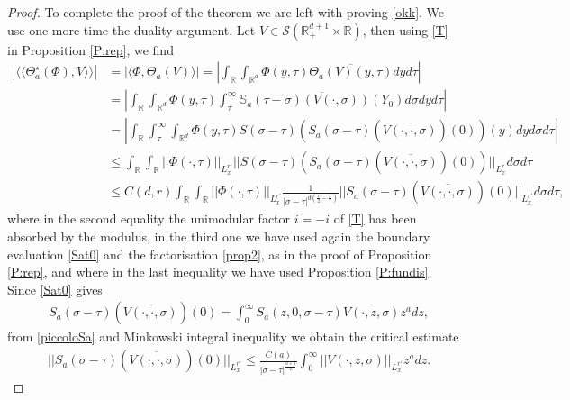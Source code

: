 \documentclass[11pt,letter]{amsart}
\def \RN {\mathbb{R}_+^{d+1}}
\def \R {\mathbb{R}}
\newcommand{\Rd}{\mathbb R^d}
\numberwithin{equation}{section}
\newcommand{\sa}{\langle}
\newcommand{\da}{\rangle}
\numberwithin{equation}{section}
\begin{document}
\begin{proof}
To complete the proof of the theorem we are left with proving \eqref{okk}. We use one more time the duality argument. Let $V\in \mathscr S(\RN\times \R)$, then using \eqref{T} in Proposition \ref{P:rep}, we find
\begin{align*}
\left|\sa\sa \Theta_a^\star(\Phi),V\da\da\right| & = \left|\sa \Phi,\Theta_a(V)\da\right| = \left|\int_{\R} \int_{\Rd} \Phi(y,\tau) \overline{\Theta_a(V)(y,\tau)} dy d\tau\right|
\\
& = \left|\int_{\R} \int_{\Rd} \Phi(y,\tau) \int_\tau^{\infty} \overline{\mathbb S_a(\tau-\sigma)(V(\cdot,\sigma))(Y_0)} d\sigma dy d\tau\right|
\\
& = \left|\int_{\R} \int_\tau^{\infty} \int_{\Rd}\Phi(y,\tau) S(\sigma-\tau)\left(S_a(\sigma-\tau)\left(\overline{V(\cdot,\cdot,\sigma)}\right)(0)\right)(y) dy d\sigma d\tau\right|
\\
& \le \int_{\R} \int_{\R} ||\Phi(\cdot,\tau)||_{L^{r'}_x} ||S(\sigma-\tau)\left(S_a(\sigma-\tau)\left(\overline{V(\cdot,\cdot,\sigma)}\right)(0)\right)||_{L^{r}_x} d\sigma d\tau
\\
& \le C(d,r) \int_{\R} \int_{\R} ||\Phi(\cdot,\tau)||_{L^{r'}_x} \frac{1}{|\sigma-\tau|^{d(\frac 12 - \frac 1r)}} ||S_a(\sigma-\tau)\left(\overline{V(\cdot,\cdot,\sigma)}\right)(0)||_{L^{r'}_x} d\sigma d\tau,
\end{align*}
where in the second equality the unimodular factor $\overline{i} = -i$ of \eqref{T} has been absorbed by the modulus, in the third one we have used again the boundary evaluation \eqref{Sat0} and the factorisation \eqref{prop2}, as in the proof of Proposition \ref{P:rep}, and where in the last inequality we have used  Proposition \ref{P:fundis}.
Since \eqref{Sat0} gives
\begin{align*}
& S_a(\sigma-\tau)\left(\overline{V(\cdot,\cdot,\sigma)}\right)(0) = \int_0^\infty S_a(z,0,\sigma-\tau) \overline{V(\cdot,z,\sigma)} z^a dz,
\end{align*}
from \eqref{piccoloSa} and Minkowski integral inequality we obtain the critical estimate
\begin{align*}
& ||S_a(\sigma-\tau)\left(\overline{V(\cdot,\cdot,\sigma)}\right)(0)||_{L^{r'}_x} \le \frac{C(a)}{|\sigma-\tau|^{\frac{a+1}2}}  \int_0^\infty ||V(\cdot,z,\sigma)||_{L^{r'}_x} z^a dz. 
\end{align*}


\end{proof}
\end{document}
